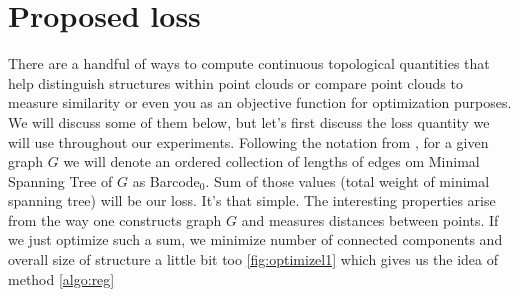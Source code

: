 



\section{Proposed loss} There are a handful of ways to compute continuous topological quantities that help distinguish structures within point clouds or compare point clouds to measure similarity or even you as an objective function for optimization purposes. We will discuss some of them below, but let's first discuss the loss quantity we will use throughout our experiments. Following the notation from \cite{MTopDiv}, for a given graph $G$ we will denote an ordered collection of lengths of edges om Minimal Spanning Tree of $G$ as Barcode${}_0$. Sum of those values (total weight of minimal spanning tree) will be our loss. It's that simple. The interesting properties arise from the way one constructs graph $G$ and measures distances between points. If we just optimize such a sum, we minimize number of connected components and overall size of structure a little bit too \ref{fig:optimizel1} which gives us the idea of method \ref{algo:reg}


